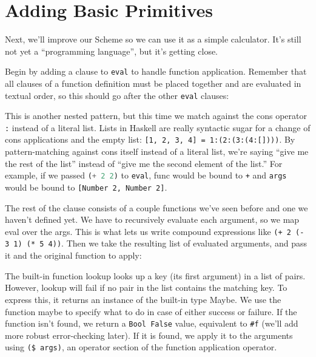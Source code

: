 \section{Adding Basic Primitives}
 
Next, we'll improve our Scheme so we can use it as a simple calculator. It's still not yet a ``programming language'', but it's getting close.
 
Begin by adding a clause to \verb|eval| to handle function application. Remember that all clauses of a function definition must be placed together and are evaluated in textual order, so this should go after the other \verb|eval| clauses:
 
 
This is another nested pattern, but this time we match against the cons operator \lstinline|:| instead of a literal list. Lists in Haskell are really syntactic sugar for a change of cons applications and the empty list: \lstinline|[1, 2, 3, 4] = 1:(2:(3:(4:[])))|. By pattern-matching against cons itself instead of a literal list, we're saying ``give me the rest of the list'' instead of ``give me the second element of the list.'' For example, if we passed \lstinline[language=Lisp]|(+ 2 2)| to \verb|eval|, func would be bound to \lstinline|+| and \verb|args| would be bound to \lstinline|[Number 2, Number 2]|.
 
The rest of the clause consists of a couple functions we've seen before and one we haven't defined yet. We have to recursively evaluate each argument, so we map eval over the args. This is what lets us write compound expressions like \lstinline|(+ 2 (- 3 1) (* 5 4))|. Then we take the resulting list of evaluated arguments, and pass it and the original function to apply:
 
 
The built-in function lookup looks up a key (its first argument) in a list of pairs. However, lookup will fail if no pair in the list contains the matching key. To express this, it returns an instance of the built-in type Maybe. We use the function maybe to specify what to do in case of either success or failure. If the function isn't found, we return a \lstinline|Bool False| value, equivalent to \lstinline|#f| (we'll add more robust error-checking later). If it is found, we apply it to the arguments using \verb|($ args)|, an operator section of the function application operator.
 
